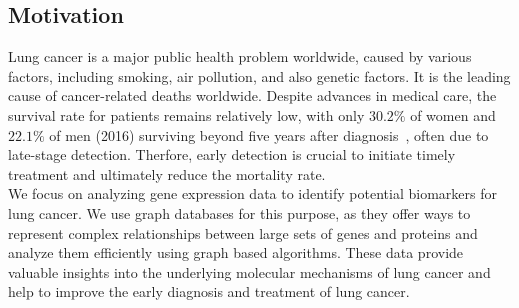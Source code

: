 \subsection{Motivation} \label{subsec:motivation}

Lung cancer is a major public health problem worldwide, caused by various factors,
including smoking, air pollution, and also genetic factors.
It is the leading cause of cancer-related deaths worldwide\cite{ferlay2024global}.
Despite advances in medical care, the survival rate for patients remains relatively low,
with only $30.2\%$ of women and $22.1\%$ of men (2016)
surviving beyond five years after diagnosis~\cite{seer2024explorer}, often due to late-stage detection.
Therfore, early detection is crucial to initiate timely treatment and ultimately reduce the mortality rate.
\\

We focus on analyzing gene expression data to identify potential biomarkers for lung cancer.
We use graph databases for this purpose,
as they offer ways to represent complex relationships between large sets of genes and proteins
and analyze them efficiently using graph based algorithms.
These data provide valuable insights into the underlying molecular mechanisms of lung cancer
and help to improve the early diagnosis and treatment of lung cancer.